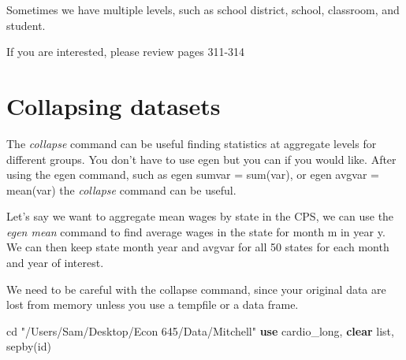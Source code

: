 \documentclass[
]{book}
\newenvironment{Shaded}{\begin{snugshade}}{\end{snugshade}}
\newcommand{\KeywordTok}[1]{\textcolor[rgb]{0.13,0.29,0.53}{\textbf{#1}}}
\newcommand{\NormalTok}[1]{#1}
\newcommand{\OtherTok}[1]{\textcolor[rgb]{0.56,0.35,0.01}{#1}}
\newcommand{\StringTok}[1]{\textcolor[rgb]{0.31,0.60,0.02}{#1}}
\begin{document}
Sometimes we have multiple levels, such as school district, school, classroom, and student.

If you are interested, please review pages 311-314

\section{Collapsing datasets}\label{collapsing-datasets}

The \emph{collapse} command can be useful finding statistics at aggregate levels for different groups. You don't have to use egen but you can if you would like. After using the egen command, such as egen sumvar = sum(var),
or egen avgvar = mean(var) the \emph{collapse} command can be useful.

Let's say we want to aggregate mean wages by state in the CPS, we can use the \emph{egen mean} command to find average wages in the state for month m in year y. We can then keep state month year and avgvar for all 50 states for each
month and year of interest.

We need to be careful with the collapse command, since your original data are lost from memory unless you use a tempfile or a data frame.

\begin{Shaded}
\begin{Highlighting}[]
\NormalTok{cd }\StringTok{"/Users/Sam/Desktop/Econ 645/Data/Mitchell"}
\KeywordTok{use}\NormalTok{ cardio\_long, }\KeywordTok{clear}
\OtherTok{list}\NormalTok{, sepby(id)}
\end{Highlighting}
\end{Shaded}
\end{document}
